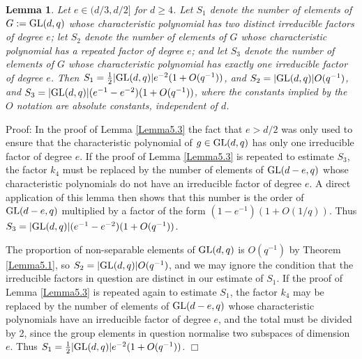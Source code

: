 \documentclass[12pt]{article}
\newtheorem{lemma}[definition]{Lemma}
\newenvironment{proof}{\normalsize {\sc Proof}:}{{\hfill $\Box$ \\}}
\def\GL{{\rm GL}}
\begin{document}
\begin{lemma}\label{Lemma5.4} Let $e\in(d/3,d/2]$ for $d \geq 4$.
Let $S_1$ denote the number of elements of $G:=\GL(d,q)$ whose characteristic polynomial
has two distinct irreducible factors of degree $e$; let $S_2$ denote the number
of elements of $G$ whose characteristic polynomial has a repeated factor of
degree $e$; and let $S_3$ denote the number of elements of $G$ whose characteristic
polynomial has exactly one irreducible factor of degree $e$. 
Then $S_1={1\over2}\vert\GL(d,q)\vert e^{-2}(1+O(q^{-1}))$, and 
$S_2=\vert\GL(d,q)\vert O(q^{-1})$, 
and $S_3=\vert\GL(d,q)\vert(e^{-1}-e^{-2})(1+O(q^{-1}))$,
where the constants implied by the $O$ notation are absolute constants,
independent of $d$.
\end{lemma}
\begin{proof}  In the proof of Lemma \ref{Lemma5.3} the fact 
that $e>d/2$ was only used
to ensure that the characteristic polynomial of $g\in \GL(d,q)$ has 
only one irreducible factor of degree $e$.  
If the proof of Lemma \ref{Lemma5.3} is repeated to estimate $S_3$, the
factor $k_4$ must be replaced by the number of elements of $\GL(d-e,q)$ whose
characteristic polynomials do not have an irreducible factor of degree $e$. A
direct application of this lemma then shows that this number is the order
of $\GL(d-e,q)$ multiplied by a factor of the form $(1-e^{-1})(1+O(1/q))$.
Thus $S_3=\vert\GL(d,q)\vert(e^{-1}-e^{-2})(1+O(q^{-1}))$. 

The proportion of non-separable elements of $\GL(d,q)$ is
$O(q^{-1})$ by Theorem \ref{Lemma5.1}, so $S_2=\vert\GL(d,q)\vert O(q^{-1})$,
and we may ignore the condition that the irreducible factors in question are
distinct in our estimate of $S_1$.
 If the proof of
Lemma \ref{Lemma5.3} is repeated again to estimate $S_1$, the factor $k_4$ may
be replaced by the number of elements of $\GL(d-e,q)$ whose characteristic
polynomials have an irreducible factor of degree $e$, and the total
must be divided by 2, since the group elements in question normalise
two subspaces of dimension $e$.  
Thus $S_1={1\over2}\vert\GL(d,q)\vert e^{-2}(1+O(q^{-1}))$.  
\end{proof}
\end{document}
